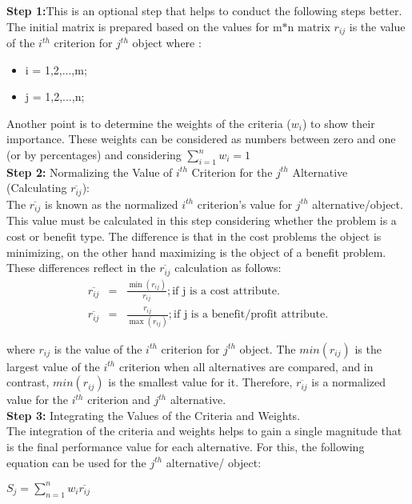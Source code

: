 \documentclass[12pt,a4paper]{article}
\begin{document}
\textbf{Step 1:}This is an optional step that helps to conduct the following steps better.\\

The initial matrix is prepared based on the values for m$*$n matrix $r_{ij}$ is the value of the $i^{th}$ criterion for $j^{th}$ object where :

\begin{itemize}
    \item i = 1,2,...,m;
    \item j = 1,2,...,n;
\end{itemize}

Another point is to determine the weights of the
criteria ($w_{i}$) to show their importance. These weights
can be considered as numbers between zero and one
(or by percentages) and considering $\sum\limits^{n}_{i=1}w_{i}=1$\\

\textbf{Step 2:} Normalizing the Value of $i^{th}$ Criterion
for the $j^{th}$ Alternative (Calculating $\overline{r_{ij}}$):\\

The $\overline{r_{ij}}$ is known as the normalized $i^{th}$ criterion’s value for $j^{th}$ alternative/object. This value must be calculated in this step considering whether the problem is a cost or benefit type. The difference is that
in the cost problems the object is minimizing, on the other hand maximizing is the object of a benefit problem. These differences reflect in the $\overline{r_{ij}}$ calculation as follows:\\
\begin{eqnarray*}
\overline{r_{ij}}&=&\frac{\min (r_{ij})}{r_{ij}} ; \text{if j is a cost attribute.}\\
\overline{r_{ij}}&=&\frac{r_{ij}}{\max(r_{ij})} ; \text{if j is a benefit/profit attribute.}
\end{eqnarray*}

where $r_{ij}$ is the value of the $i^{th}$ criterion for $j^{th}$ object. The $min (r_{ij})$ is the largest value of the $i^{th}$ criterion when all alternatives are compared, and in contrast, $min (r_{ij})$ is the smallest value for it. Therefore,
 $\overline{r_{ij}}$ is a normalized value for the $i^{th}$ criterion and $j^{th}$
alternative.\\

\textbf{Step 3:} Integrating the Values of the Criteria and
Weights.\\

The integration of the criteria and weights helps
to gain a single magnitude that is the final performance value for each alternative. For this, the following equation can be used for the $j^{th}$ alternative/
object:\\
\begin{center}
    $S_{j}=\sum\limits^{n}_{n=1}w_{i}\overline{r_{ij}}$
\end{center}
\end{document}

